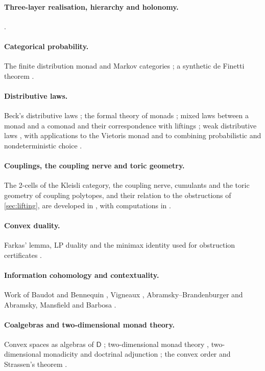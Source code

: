 \documentclass[11pt]{article}
\theoremstyle{definition}
\theoremstyle{remark}
\newcommand{\D}{\mathsf{D}}
\begin{document}
\paragraph{Three-layer realisation, hierarchy and holonomy.}
\cite{Awasthi-ThreeLayers,Awasthi-Hierarchy,Awasthi-Holonomy}.
\paragraph{Categorical probability.} The finite distribution monad and Markov categories
\cite{Fritz2020,FGPR2023}; a synthetic de Finetti theorem \cite{FGP2021}.
\paragraph{Distributive laws.} Beck's distributive laws \cite{Beck1969}; the formal theory of monads
\cite{Street1972}; mixed laws between a monad and a comonad and their correspondence with liftings
\cite{PowerWatanabe2002}; weak distributive
laws \cite{Street2009,Bohm2010,BohmLackStreet2011}, with applications to the Vietoris monad
\cite{Garner2020} and to combining probabilistic and nondeterministic choice \cite{GoyPetrisan2020}.
\paragraph{Couplings, the coupling nerve and toric geometry.} The 2-cells of the Kleisli category, the coupling
nerve, cumulants and the toric geometry of coupling polytopes, and their relation to the obstructions of
\cref{sec:lifting}, are developed in \cite{Conditionals}, with computations in \cite{Awasthi-Family}.
\paragraph{Convex duality.} Farkas' lemma, LP duality and the minimax identity used for
obstruction certificates \cite{Schrijver1986}.
\paragraph{Information cohomology and contextuality.} Work of Baudot and Bennequin \cite{BaudotBennequin2015},
Vigneaux \cite{Vigneaux2019}, Abramsky--Brandenburger \cite{AbramskyBrandenburger2011} and
Abramsky, Mansfield and Barbosa \cite{AbramskyMansfieldBarbosa2012}.
\paragraph{Coalgebras and two-dimensional monad theory.} Convex spaces as algebras of $\D$
\cite{Fritz2009}; two-dimensional monad theory \cite{BKP1989,Lack2002}, two-dimensional monadicity
\cite{Bourke2014} and doctrinal adjunction \cite{Kelly1974}; the convex order and Strassen's theorem
\cite{Strassen1965}.
\end{document}
